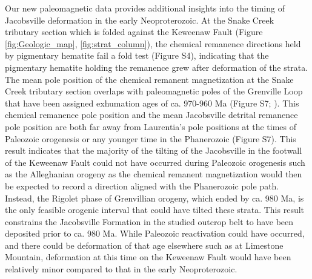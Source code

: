 \documentclass[draft]{agujournal2019}
\begin{document}
Our new paleomagnetic data provides additional insights into the timing of Jacobsville deformation in the early Neoproterozoic. At the Snake Creek tributary section which is folded against the Keweenaw Fault (Figure \ref{fig:Geologic_map}, \ref{fig:strat_column}), the chemical remanence directions held by pigmentary hematite fail a fold test (Figure S4), indicating that the pigmentary hematite holding the remanence grew after deformation of the strata. The mean pole position of the chemical remanent magnetization at the Snake Creek tributary section overlaps with paleomagnetic poles of the Grenville Loop that have been assigned exhumation ages of ca. 970-960 Ma (Figure S7; ). This chemical remanence pole position and the mean Jacobsville detrital remanence pole position are both far away from Laurentia's pole positions at the times of Paleozoic orogenesis or any younger time in the Phanerozoic (Figure S7). This result indicates that the majority of the tilting of the Jacobsville in the footwall of the Keweenaw Fault could not have occurred during Paleozoic orogenesis such as the Alleghanian orogeny as the chemical remanent magnetization would then be expected to record a direction aligned with the Phanerozoic pole path. Instead, the Rigolet phase of Grenvillian orogeny, which ended by ca. 980 Ma, is the only feasible orogenic interval that could have tilted these strata. This result constrains the Jacobsville Formation in the studied outcrop belt to have been deposited prior to ca. 980 Ma. While Paleozoic reactivation could have occurred, and there could be deformation of that age elsewhere such as at Limestone Mountain, deformation at this time on the Keweenaw Fault would have been relatively minor compared to that in the early Neoproterozoic.
\end{document}
